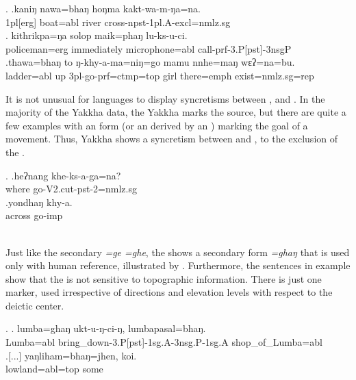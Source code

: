 \ex. \ag.kaniŋ nawa=bhaŋ hoŋma kakt-wa-m-ŋa=na.\\
{\sc 1pl[erg]} boat{\sc =abl} river cross{\sc -npst-1pl.A-excl=nmlz.sg}\\
\bg. kithrikpa=ŋa   solop       maik=phaŋ         lu-ks-u-ci.\\
policeman{\sc =erg} immediately microphone{\sc =abl} call{\sc -prf-3.P[pst]-3nsgP}\\
\bg.thawa=bhaŋ    to  ŋ-khy-a-ma=niŋ=go                    mamu nnhe=maŋ    wɛʔ=na=bu.\\
ladder{\sc =abl} up {\sc 3pl-}go{\sc -prf=ctmp=top} girl there{\sc =emph} exist{\sc [3sg]=nmlz.sg=rep}\\


It is not unusual for  languages to display syncretisms between ,  and  \citep{DeLancey1985_Etymological}. In the majority of the Yakkha data, the Yakkha  marks the source, but there are quite a few examples with an  form (or an  derived by an ) marking the goal of a movement. Thus, Yakkha shows a syncretism between  and , to the exclusion of the .

\ex. \ag.heʔnang khe-ks-a-ga=na?\\
where{\sc [abl]} go{\sc -V2.cut-pst-2=nmlz.sg}\\
\bg.yondhaŋ khy-a.\\
across{\sc [abl]} go{\sc -imp}\\
\\

Just like the secondary  \emph{=ge \ti =ghe}, the  shows a secondary form \emph{=ghaŋ} that is used only with human reference, illustrated  by \Next[a]. Furthermore, the sentences in example \Next show that the  is not sensitive to topographic information. There is just one marker, used irrespective of directions and elevation levels with respect to the deictic center.

\ex. \ag. lumba=ghaŋ     ukt-u-ŋ-ci-ŋ, lumbapasal=bhaŋ.\\
Lumba{\sc =abl} bring\_down{\sc -3.P[pst]-1sg.A-3nsg.P-1sg.A} shop\_of\_Lumba{\sc =abl}\\
 
\bg.[...] yaŋliham=bhaŋ=jhen,    koi.\\
[...] lowland{\sc =abl=top} some\\
 
 
